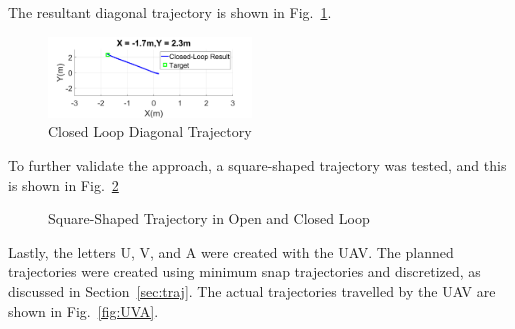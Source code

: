 \documentclass[letterpaper, 10 pt, conference]{ieeeconf}  %
\begin{document}
The resultant diagonal trajectory is shown in Fig.~\ref{fig:1723trajs}.

\begin{figure}[ht]
    \includegraphics[width=0.48\textwidth]{images/1723closed.png}
    \caption{Closed Loop Diagonal Trajectory}
    \label{fig:1723trajs}
\end{figure}

To further validate the approach, a square-shaped trajectory was tested, and this is shown in Fig.~\ref{fig:sqr}
\begin{figure}[ht!]
	\centering
	\caption{Square-Shaped Trajectory in Open and Closed Loop}
	\label{fig:sqr}
\end{figure}

Lastly, the letters U, V, and A were created with the UAV. The planned trajectories were created using minimum snap trajectories and discretized, as discussed in Section~\ref{sec:traj}. The actual trajectories travelled by the UAV are shown in Fig.~\ref{fig:UVA}.
\end{document}
